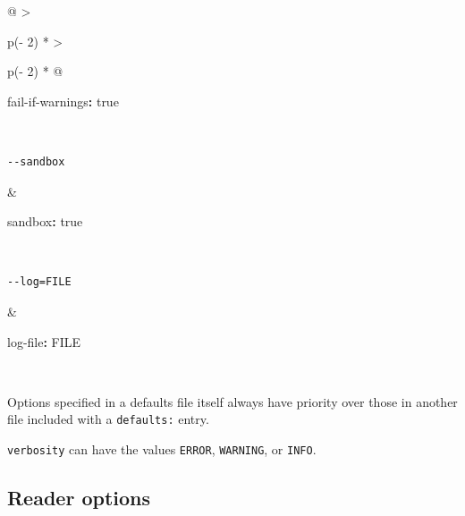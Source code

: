 \documentclass[
]{article}
\newenvironment{Shaded}{}{}
\newcommand{\AttributeTok}[1]{\textcolor[rgb]{0.49,0.56,0.16}{#1}}
\newcommand{\CharTok}[1]{\textcolor[rgb]{0.25,0.44,0.63}{#1}}
\newcommand{\FunctionTok}[1]{\textcolor[rgb]{0.02,0.16,0.49}{#1}}
\newcommand{\KeywordTok}[1]{\textcolor[rgb]{0.00,0.44,0.13}{\textbf{#1}}}
\begin{document}
\begin{longtable}[]{@{}
  >{\raggedright\arraybackslash}p{(\columnwidth - 2\tabcolsep) * }
  >{\raggedright\arraybackslash}p{(\columnwidth - 2\tabcolsep) * }@{}}
\begin{minipage}[t]{\linewidth}
\begin{Shaded}
\begin{Highlighting}[]
\FunctionTok{fail{-}if{-}warnings}\KeywordTok{:}\AttributeTok{ }\CharTok{true}
\end{Highlighting}
\end{Shaded}
\end{minipage} \\
\begin{minipage}[t]{\linewidth}\raggedright
\begin{verbatim}
--sandbox
\end{verbatim}
\end{minipage} & \begin{minipage}[t]{\linewidth}\raggedright
\begin{Shaded}
\begin{Highlighting}[]
\FunctionTok{sandbox}\KeywordTok{:}\AttributeTok{ }\CharTok{true}
\end{Highlighting}
\end{Shaded}
\end{minipage} \\
\begin{minipage}[t]{\linewidth}\raggedright
\begin{verbatim}
--log=FILE
\end{verbatim}
\end{minipage} & \begin{minipage}[t]{\linewidth}\raggedright
\begin{Shaded}
\begin{Highlighting}[]
\FunctionTok{log{-}file}\KeywordTok{:}\AttributeTok{ FILE}
\end{Highlighting}
\end{Shaded}
\end{minipage} \\
\end{longtable}

Options specified in a defaults file itself always have priority over
those in another file included with a \texttt{defaults:} entry.

\texttt{verbosity} can have the values \texttt{ERROR}, \texttt{WARNING},
or \texttt{INFO}.

\hypertarget{reader-options-1}{%
\subsection{Reader options}\label{reader-options-1}}
\end{document}
